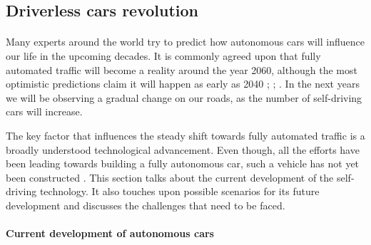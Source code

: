 \documentclass[11pt,english,twoside]{article}
\begin{document}


\subsection{Driverless cars revolution}
\paragraph{}
Many experts around the world try to predict how autonomous cars will influence our life in the upcoming decades. It is commonly agreed upon that fully automated traffic will become a reality around the year 2060, although the most optimistic predictions claim it will happen as early as 2040 \citep{kitti2012we}; \citep{litman2014autonomous}; \citep{sivak2015road}. In the next years we will be observing a gradual change on our roads, as the number of self-driving cars will increase. 
\par
The key factor that influences the steady shift towards fully automated traffic is a broadly understood technological advancement. Even though, all the efforts have been leading towards building a fully autonomous car, such a vehicle has not yet been constructed \citep{litman2014autonomous}. 
This section talks about the current development of the self-driving  technology. It also touches upon possible scenarios for its future development and discusses the challenges that need to be faced.


\paragraph{Current development of autonomous cars}
\end{document}

